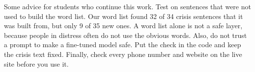 \documentclass[a4paper]{article}
\begin{document}
Some advice for students who continue this work. Test on sentences that were not used to build the word list. Our word list found 32 of 34 crisis sentences that it was built from, but only 9 of 35 new ones. A word list alone is not a safe layer, because people in distress often do not use the obvious words. Also, do not trust a prompt to make a fine-tuned model safe. Put the check in the code and keep the crisis text fixed. Finally, check every phone number and website on the live site before you use it.

\printbibliography
\end{document}
